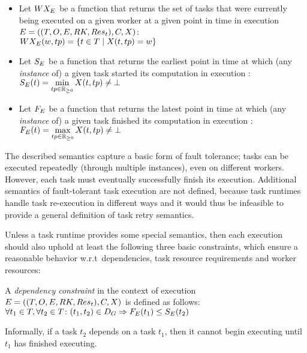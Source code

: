 \begin{itemize}[itemsep=0pt]
	\item Let $WX_E$ be a function that returns the set of tasks that were currently being
	executed on a given worker at a given point in time in execution
	$E = ((T, O, E, RK, Res_t), C, X)$: \\
	$WX_E(w, tp) = \{t \in{} T \mid X(t, tp) = w \}$
	\item Let $S_E$ be a function that returns the earliest point in time at which (any
	\emph{instance} of) a given task started its computation in execution \taskgraphexecution: \\
	$S_E(t) = \min\limits_{tp \in\mathbb{R}_{\geq{}0}} X(t, tp) \neq \bot$
	\item Let $F_E$ be a function that returns the latest point in time at which (any
	\emph{instance} of) a given task finished its computation in execution \taskgraphexecution: \\
	$F_E(t) = \max\limits_{tp \in\mathbb{R}_{\geq{}0}} X(t, tp) \neq \bot$
\end{itemize}

The described semantics capture a basic form of fault tolerance; tasks can be executed repeatedly
(through multiple instances), even on different workers. However, each task must eventually
successfully finish its execution. Additional semantics of fault-tolerant task execution are not
defined, because task runtimes handle task re-execution in different ways and it would thus be
infeasible to provide a general definition of task retry semantics.

Unless a task runtime provides some special semantics, then each execution
should also uphold at least the following three basic constraints, which ensure a reasonable
behavior w.r.t\ dependencies, task resource requirements and worker resources:

\vspace{2mm} A \emph{dependency constraint} in the context
of execution \\
$E = ((T, O, E, RK, Res_t), C, X)$ is defined as follows: \vspace{1mm}\\
$\forall t_1\in{}T, \forall t_2\in{}T\colon (t_1, t_2) \in D_G \Rightarrow F_E(t_1) \leq S_E(t_2)$

\vspace{1mm}Informally, if a task $t_2$ depends on a task $t_1$, then it cannot begin executing
until $t_1$ has finished executing.

